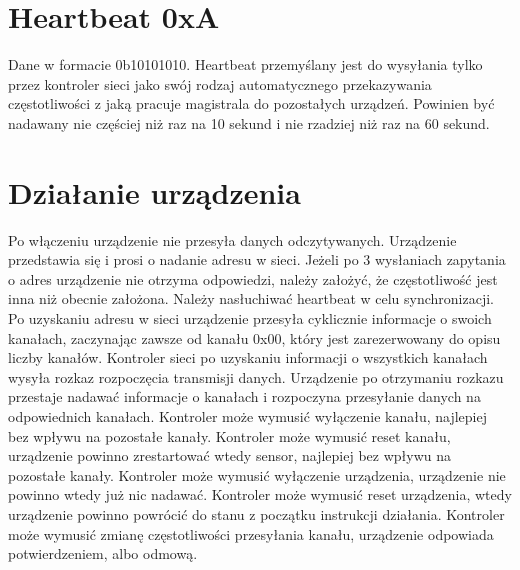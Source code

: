 \documentclass{article}
\begin{document}
\section*{Heartbeat 0xA}
Dane w formacie 0b10101010. Heartbeat przemyślany jest do wysyłania tylko przez kontroler sieci jako swój rodzaj automatycznego przekazywania częstotliwości z jaką pracuje magistrala do pozostałych urządzeń. Powinien być nadawany nie częściej niż raz na 10 sekund i nie rzadziej niż raz na 60 sekund. 

\section*{Działanie urządzenia}
Po włączeniu urządzenie nie przesyła danych odczytywanych.\newline
Urządzenie przedstawia się i prosi o nadanie adresu w sieci.\newline
Jeżeli po 3 wysłaniach zapytania o adres urządzenie nie otrzyma odpowiedzi, należy założyć, że częstotliwość jest inna niż obecnie założona. Należy nasłuchiwać heartbeat w celu synchronizacji.
Po uzyskaniu adresu w sieci urządzenie przesyła cyklicznie informacje o swoich kanałach, zaczynając zawsze od kanału 0x00, który jest zarezerwowany do opisu liczby kanałów.\newline
Kontroler sieci po uzyskaniu informacji o wszystkich kanałach wysyła rozkaz rozpoczęcia transmisji danych.\newline
Urządzenie po otrzymaniu rozkazu przestaje nadawać informacje o kanałach i rozpoczyna przesyłanie danych na odpowiednich kanałach.\newline
Kontroler może wymusić wyłączenie kanału, najlepiej bez wpływu na pozostałe kanały.\newline
Kontroler może wymusić reset kanału, urządzenie powinno zrestartować wtedy sensor, najlepiej bez wpływu na pozostałe kanały.\newline
Kontroler może wymusić wyłączenie urządzenia, urządzenie nie powinno wtedy już nic nadawać.\newline
Kontroler może wymusić reset urządzenia, wtedy urządzenie powinno powrócić do stanu z początku instrukcji działania.\newline
Kontroler może wymusić zmianę częstotliwości przesyłania kanału, urządzenie odpowiada potwierdzeniem, albo odmową.\newline
\end{document}
